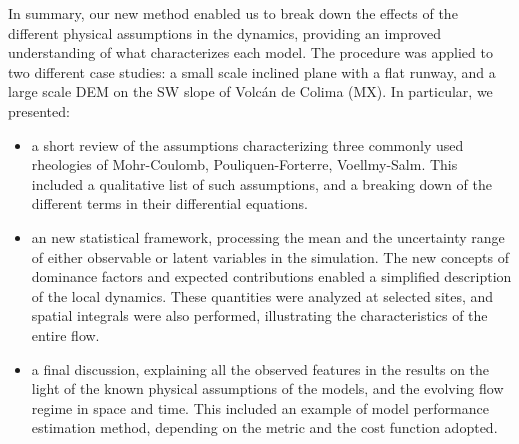 \documentclass{article}
\begin{document}
In summary, our new method enabled us to break down the effects of the different physical assumptions in the dynamics, providing an improved understanding of what characterizes each model. The procedure was applied to two different case studies: a small scale inclined plane with a flat runway, and a large scale DEM on the SW slope of Volc\'{a}n de Colima (MX). In particular, we presented:
\begin{itemize}
  \item a short review of the assumptions characterizing three commonly used rheologies of Mohr-Coulomb, Pouliquen-Forterre, Voellmy-Salm. This included a qualitative list of such assumptions, and a breaking down of the different terms in their differential equations.
  \item an new statistical framework, processing the mean and the uncertainty range of either observable or latent variables in the simulation. The new concepts of dominance factors and expected contributions enabled a simplified description of the local dynamics. These quantities were analyzed at selected sites, and spatial integrals were also performed, illustrating the characteristics of the entire flow.
  \item a final discussion, explaining all the observed features in the results on the light of the known physical assumptions of the models, and the evolving flow regime in space and time. This included an example of model performance estimation method, depending on the metric and the cost function adopted.
\end{itemize}
\end{document}
